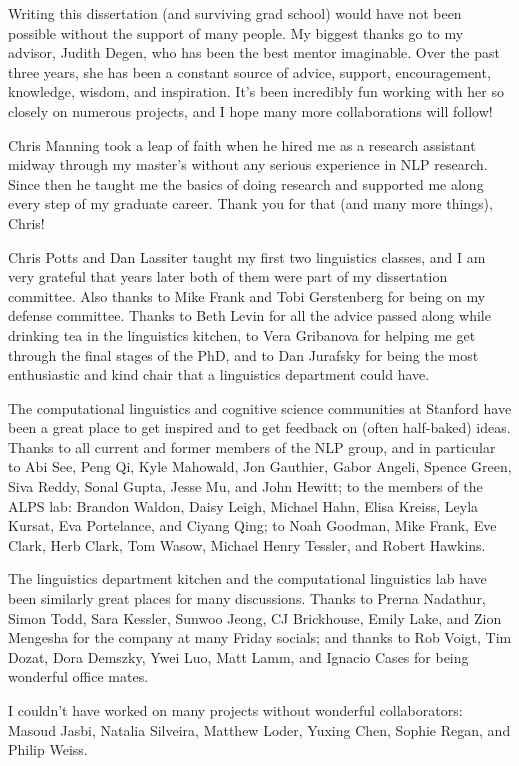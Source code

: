Writing this dissertation (and surviving grad school) would have not been possible without the support of many people. My biggest thanks go to my advisor, Judith Degen, who has been the best mentor imaginable. Over the past three years, she has been a constant source of advice, support, encouragement, knowledge, wisdom, and inspiration. It's been incredibly fun working with her so closely on numerous projects, and I hope many more collaborations will follow!

Chris Manning took a leap of faith when he hired me as a research assistant midway through my master's without any serious experience in NLP research. Since then he taught me the basics of doing research and supported me along every step of my graduate career. Thank you for that (and many more things), Chris!

Chris Potts and Dan Lassiter taught my first two linguistics classes, and I am very grateful that years later both of them were part of my dissertation committee. Also thanks to Mike Frank and Tobi Gerstenberg for being on my defense committee. Thanks to Beth Levin for all the advice passed along while drinking tea in the linguistics kitchen, to Vera Gribanova for helping me get through the final stages of the PhD, and to Dan Jurafsky for being the most enthusiastic and kind chair that a linguistics department could have.

The computational linguistics and cognitive science communities at Stanford have been a great place to get inspired and to get feedback on (often half-baked) ideas. Thanks to all current and former members of the NLP group, and in particular to Abi See, Peng Qi, Kyle Mahowald, Jon Gauthier, Gabor Angeli, Spence Green, Siva Reddy, Sonal Gupta, Jesse Mu, and John Hewitt; to the members of the ALPS lab: Brandon Waldon, Daisy Leigh, Michael Hahn, Elisa Kreiss, Leyla Kursat, Eva Portelance, and Ciyang Qing; to Noah Goodman, Mike Frank, Eve Clark, Herb Clark, Tom Wasow, Michael Henry Tessler, and Robert Hawkins.

The linguistics department kitchen and the computational linguistics lab have been similarly great places for many discussions. Thanks to Prerna Nadathur, Simon Todd, Sara Kessler, Sunwoo Jeong, CJ Brickhouse, Emily Lake, and Zion Mengesha for the company at many Friday socials; and thanks to Rob Voigt, Tim Dozat, Dora Demszky, Ywei Luo, Matt Lamm, and Ignacio Cases for being wonderful office mates.

I couldn't have worked on many projects without wonderful collaborators: Masoud Jasbi, Natalia Silveira, Matthew Loder, Yuxing Chen, Sophie Regan, and Philip Weiss.

